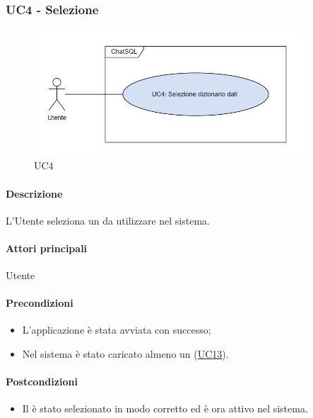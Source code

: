\subsubsection{UC4 - Selezione }\label{UC4}

\begin{figure}[H]
  \centering
  \includegraphics[width=0.90\textwidth]{assets/uc4.png}
  \caption{UC4}
\end{figure}

\paragraph*{Descrizione}
L'Utente seleziona un  da utilizzare nel sistema.

\paragraph*{Attori principali}
Utente

\paragraph*{Precondizioni}
\begin{itemize}
  \item L'applicazione è stata avviata con successo;
  \item Nel sistema è stato caricato almeno un  (\hyperref[UC13]{UC13}).
\end{itemize}

\paragraph*{Postcondizioni}
\begin{itemize}
  \item Il  è stato selezionato in modo corretto ed è ora attivo nel sistema.
\end{itemize}

